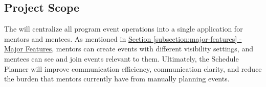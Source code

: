 \subsection{Project Scope}

The {\ClientName} {\ClientProject} will centralize all program event operations
into a single application for mentors and mentees. As mentioned in
\hyperref[subsection:major-features]{Section \ref*{subsection:major-features} -
Major Features}, mentors can create events with different visibility settings,
and mentees can see and join events relevant to them. Ultimately, the
{\ClientName} Schedule Planner will improve communication efficiency,
communication clarity, and reduce the burden that mentors currently have from
manually planning events.
